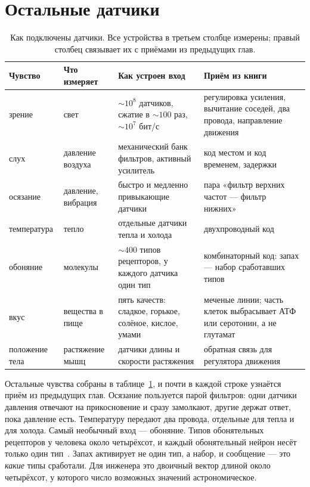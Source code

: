 \section{Остальные датчики}

\begin{table}[t]
\centering
\footnotesize
\setlength{\tabcolsep}{3pt}
\renewcommand{\arraystretch}{1.15}
\begin{tabular}{>{\raggedright}p{1.9cm}>{\raggedright}p{2.6cm}>{\raggedright}p{4.0cm}>{\raggedright\arraybackslash}p{4.6cm}}
\toprule
Чувство & Что измеряет & Как устроен вход & Приём из книги \\
\midrule
зрение & свет & $\sim10^8$ датчиков, сжатие в $\sim100$ раз, $\sim10^7$ бит/с & регулировка усиления, вычитание соседей, два провода, направление движения \\
слух & давление воздуха & механический банк фильтров, активный усилитель & код местом и код временем, задержки \\
осязание & давление, вибрация & быстро и медленно привыкающие датчики & пара «фильтр верхних частот --- фильтр нижних» \\
температура & тепло & отдельные датчики тепла и холода & двухпроводный код \\
обоняние & молекулы & $\sim400$ типов рецепторов, у каждого датчика один тип & комбинаторный код: запах --- набор сработавших типов \\
вкус & вещества в пище & пять качеств: сладкое, горькое, солёное, кислое, умами & меченые линии; часть клеток выбрасывает АТФ или серотонин, а не глутамат \\
положение тела & растяжение мышц & датчики длины и скорости растяжения & обратная связь для регулятора движения \\
\bottomrule
\end{tabular}
\caption{Как подключены датчики. Все устройства в третьем столбце измерены; правый столбец связывает их с приёмами из предыдущих глав.}
\label{tab:sensors}
\end{table}

Остальные чувства собраны в таблице~\ref{tab:sensors}, и почти в каждой строке узнаётся приём из предыдущих глав. Осязание пользуется парой фильтров: одни датчики давления отвечают на прикосновение и сразу замолкают, другие держат ответ, пока давление есть. Температуру передают два провода, отдельные для тепла и для холода. Самый необычный вход --- обоняние. Типов обонятельных рецепторов у человека около четырёхсот, и каждый обонятельный нейрон несёт только один тип~\cite{Mombaerts2004}. Запах активирует не один тип, а набор, и сообщение --- это \emph{какие} типы сработали. Для инженера это двоичный вектор длиной около четырёхсот, у которого число возможных значений астрономическое.

